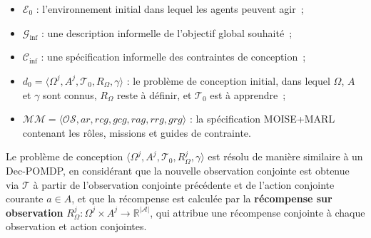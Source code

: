 \begin{itemize}
    \item $\mathcal{E}_0$ : l'environnement initial dans lequel les agents peuvent agir~;
    \item $\mathcal{G}_{\text{inf}}$ : une description informelle de l'objectif global souhaité~;
    \item $\mathcal{C}_{\text{inf}}$ : une spécification informelle des contraintes de conception~;
    \item $d_0 = \langle \Omega^j, A^j, \mathcal{T}_0, R_{\Omega}, \gamma \rangle$ : le problème de conception initial, dans lequel $\Omega$, $A$ et $\gamma$ sont connus, $R_{\Omega}$ reste à définir, et $\mathcal{T}_0$ est à apprendre~;
    \item $\mathcal{MM} = \langle \mathcal{OS}, ar, rcg, gcg, rag, rrg, grg \rangle$ : la spécification MOISE+MARL contenant les rôles, missions et guides de contrainte.
\end{itemize}

Le problème de conception $\langle \Omega^j, A^j, \mathcal{T}_0, R_{\Omega}^j, \gamma \rangle$ est résolu de manière similaire à un Dec-POMDP, en considérant que la nouvelle observation conjointe est obtenue via $\mathcal{T}$ à partir de l'observation conjointe précédente et de l'action conjointe courante $a \in A$, et que la récompense est calculée par la \textbf{récompense sur observation} $R^j_{\Omega}: \Omega^j \times A^j \rightarrow \mathbb{R}^{|\mathcal{A}|}$, qui attribue une récompense conjointe à chaque observation et action conjointes.

\vspace{1em}

